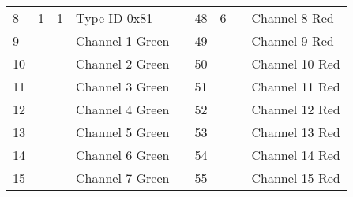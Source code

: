 \documentclass[]{article}
\begin{document}
\begin{landscape}
\begin{table}[]
\begin{tabular}{lllllllll}
			8                        & \multirow{-8}{*}{1}      & 1                        & \multirow{-8}{*}{Type ID 0x81} & \multirow{-9}{*}{} & 48                                                    & \multirow{-8}{*}{6}  & \multirow{-8}{*}{} & Channel 8 Red                                     \\ \cline{1-4} \cline{6-9} 
			9                        &                          &                          & Channel 1 Green                &                    & 49                                                    &                      &                    & Channel 9 Red                                     \\
			10                       &                          &                          & Channel 2 Green                &                    & 50                                                    &                      &                    & Channel 10 Red                                    \\
			11                       &                          &                          & Channel 3 Green                &                    & 51                                                    &                      &                    & Channel 11 Red                                    \\
			12                       &                          &                          & Channel 4 Green                &                    & 52                                                    &                      &                    & Channel 12 Red                                    \\
			13                       &                          &                          & Channel 5 Green                &                    & 53                                                    &                      &                    & Channel 13 Red                                    \\
			14                       &                          &                          & Channel 6 Green                &                    & 54                                                    &                      &                    & Channel 14 Red                                    \\
			15                       &                          &                          & Channel 7 Green                &                    & 55                                                    &                      &                    & Channel 15 Red                                    \\

\end{tabular}
\end{table}
\end{landscape}
\end{document}
